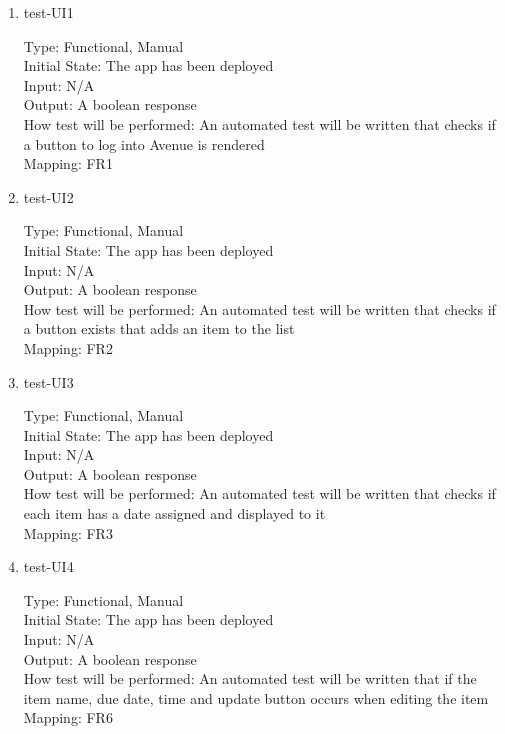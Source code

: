 \documentclass[12pt, titlepage]{article}
\begin{document}
\begin{enumerate}
\item{test-UI1\\}

Type: Functional, Manual\\
Initial State: The app has been deployed\\
Input: N/A\\
Output: A boolean response\\
How test will be performed: An automated test will be written that checks if a button to log into Avenue is rendered\\
Mapping: FR1

\item{test-UI2\\}

Type: Functional, Manual\\
Initial State: The app has been deployed\\
Input: N/A\\
Output: A boolean response\\
How test will be performed: An automated test will be written that checks if a button exists that adds an item to the list\\
Mapping: FR2

\item{test-UI3\\}

Type: Functional, Manual\\
Initial State: The app has been deployed\\
Input: N/A\\
Output: A boolean response\\
How test will be performed: An automated test will be written that checks if each item has a date assigned and displayed to it\\
Mapping: FR3

\item{test-UI4\\}

Type: Functional, Manual\\
Initial State: The app has been deployed\\
Input: N/A\\
Output: A boolean response\\
How test will be performed: An automated test will be written that if the item name, due date, time and update button occurs when editing the item\\
Mapping: FR6


\end{enumerate}
\end{document}
